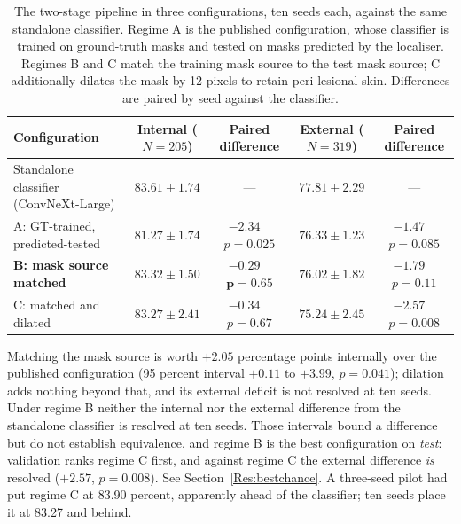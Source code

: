 \documentclass{melba}
\begin{document}
\begin{table}[t]
\centering
\caption{The two-stage pipeline in three configurations, ten seeds each, against the same standalone classifier. Regime A is the published configuration, whose classifier is trained on ground-truth masks and tested on masks predicted by the localiser. Regimes B and C match the training mask source to the test mask source; C additionally dilates the mask by 12 pixels to retain peri-lesional skin. Differences are paired by seed against the classifier.}
\small
\begin{tabular}{|l|c|c|c|c|}
\hline
Configuration & Internal ($N=205$) & Paired difference & External ($N=319$) & Paired difference \\
\hline
Standalone classifier (ConvNeXt-Large) & $83.61 \pm 1.74$ & --- & $77.81 \pm 2.29$ & --- \\
\hline
A: GT-trained, predicted-tested & $81.27 \pm 1.74$ & $-2.34$ \ $p=0.025$ & $76.33 \pm 1.23$ & $-1.47$ \ $p=0.085$ \\
\textbf{B: mask source matched} & $\mathbf{83.32 \pm 1.50}$ & $\mathbf{-0.29}$ \ $\mathbf{p=0.65}$ & $76.02 \pm 1.82$ & $-1.79$ \ $p=0.11$ \\
C: matched and dilated & $83.27 \pm 2.41$ & $-0.34$ \ $p=0.67$ & $75.24 \pm 2.45$ & $-2.57$ \ $p=0.008$ \\
\hline
\end{tabular}

\vspace{2mm}
\parbox{0.95\textwidth}{\footnotesize Matching the mask source is worth $+2.05$ percentage points internally over the published configuration (95 percent interval $+0.11$ to $+3.99$, $p=0.041$); dilation adds nothing beyond that, and its external deficit is not resolved at ten seeds. Under regime B neither the internal nor the external difference from the standalone classifier is resolved at ten seeds. Those intervals bound a difference but do not establish equivalence, and regime B is the best configuration on \emph{test}: validation ranks regime C first, and against regime C the external difference \emph{is} resolved ($+2.57$, $p=0.008$). See Section~\ref{Res:bestchance}. A three-seed pilot had put regime C at 83.90 percent, apparently ahead of the classifier; ten seeds place it at 83.27 and behind.}
\label{tab:regimes}
\end{table}
\end{document}
